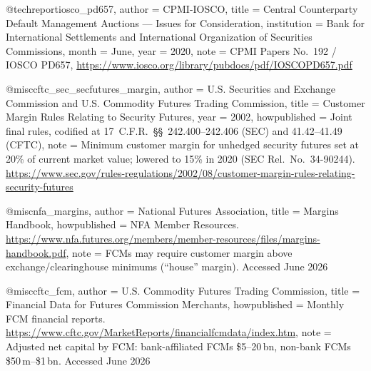 @techreport{iosco_pd657,
  author      = {{CPMI-IOSCO}},
  title       = {Central Counterparty Default Management Auctions --- Issues for Consideration},
  institution = {Bank for International Settlements and International Organization of Securities Commissions},
  month       = {June}, year = {2020},
  note         = {CPMI Papers No.~192 / IOSCO PD657, \url{https://www.iosco.org/library/pubdocs/pdf/IOSCOPD657.pdf}}
}


@misc{cftc_sec_secfutures_margin,
  author       = {{U.S. Securities and Exchange Commission and U.S. Commodity Futures Trading Commission}},
  title        = {Customer Margin Rules Relating to Security Futures},
  year         = {2002},
  howpublished = {Joint final rules, codified at 17~C.F.R.~\S\S~242.400--242.406 (SEC) and 41.42--41.49 (CFTC)},
  note         = {Minimum customer margin for unhedged security futures set at 20\% of current market value; lowered to 15\% in 2020 (SEC Rel.\ No.~34-90244). \url{https://www.sec.gov/rules-regulations/2002/08/customer-margin-rules-relating-security-futures}}
}


@misc{nfa_margins,
  author       = {{National Futures Association}},
  title        = {Margins Handbook},
  howpublished = {NFA Member Resources. \url{https://www.nfa.futures.org/members/member-resources/files/margins-handbook.pdf}},
  note         = {FCMs may require customer margin above exchange/clearinghouse minimums (``house'' margin). Accessed June 2026}
}


@misc{cftc_fcm,
  author       = {{U.S. Commodity Futures Trading Commission}},
  title        = {Financial Data for Futures Commission Merchants},
  howpublished = {Monthly FCM financial reports. \url{https://www.cftc.gov/MarketReports/financialfcmdata/index.htm}},
  note         = {Adjusted net capital by FCM: bank-affiliated FCMs \$5--20\,bn, non-bank FCMs \$50\,m--\$1\,bn. Accessed June 2026}
}

